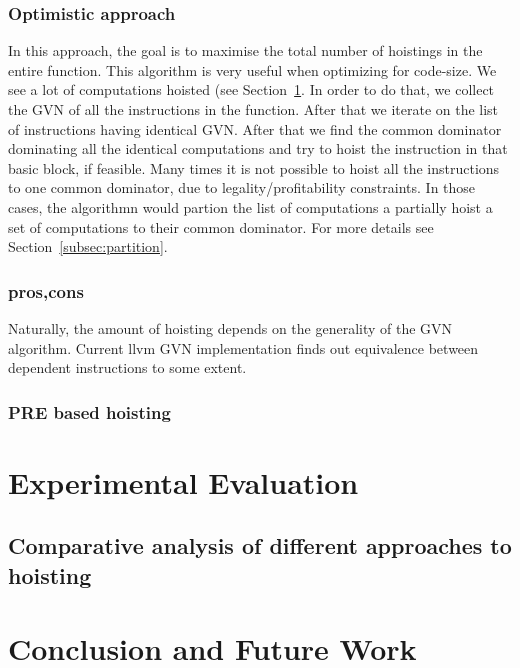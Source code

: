 \documentclass{sig-alternate}
\begin{document}
\subsubsection{Optimistic approach}
In this approach, the goal is to maximise the total number of hoistings in the
entire function.  This algorithm is very useful when optimizing for code-size.
We see a lot of computations hoisted (see
Section~\ref{sec:experimental-results}. In order to do that, we collect the GVN
of all the instructions in the function. After that we iterate on the list of
instructions having identical GVN. After that we find the common dominator
dominating all the identical computations and try to hoist the instruction in
that basic block, if feasible. Many times it is not possible to hoist all the
instructions to one common dominator, due to legality/profitability
constraints. In those cases, the algorithmn would partion the list of
computations a partially hoist a set of computations to their common
dominator. For more details see Section~\ref{subsec:partition}.


\subsubsection{pros,cons}
Naturally, the amount of hoisting depends on the generality of the GVN
algorithm. Current llvm GVN implementation finds out equivalence between
dependent instructions to some extent.

\subsubsection{PRE based hoisting}

\newpage

\section{Experimental Evaluation}
\label{sec:experimental-results}

\subsection{Comparative analysis of different approaches to hoisting}


\section{Conclusion and Future Work}


{\small

}
\end{document}
